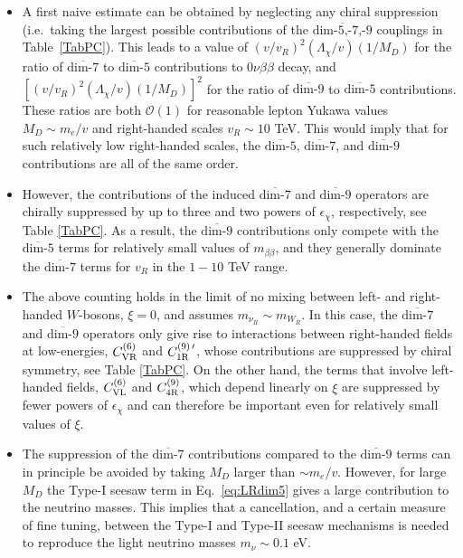 \documentclass[letterpaper,11pt]{article}
\newcommand{\bt}{\beta}
\newcommand{\textoverline}[1]{$\overline{\mbox{#1}}$}
\begin{document}
\begin{itemize}

\item  A first naive estimate can be obtained by neglecting any chiral suppression (i.e.\ taking the largest possible contributions of the \textoverline{dim-5,-7,-9} couplings in Table~\ref{TabPC}). This leads to a value of $(v/v_R)^2(\Lambda_\chi/v)(1/M_D)$ for the ratio of \textoverline{dim-7} to \textoverline{dim-5} contributions to $0\nu\beta\beta$ decay, and $[(v/v_R)^2(\Lambda_\chi/v)(1/M_D)]^2$ for the ratio of \textoverline{dim-9} to \textoverline{dim-5} contributions. These ratios are both $\mathcal O(1)$ for reasonable lepton Yukawa values $M_D \sim m_e/v$ and right-handed scales $v_R \sim 10$ TeV. This would imply that for such relatively low right-handed scales, the \textoverline{dim-5}, \textoverline{dim-7}, and \textoverline{dim-9} contributions are all of the same order.



\item  
However, the contributions of the induced \textoverline{dim-7} and \textoverline{dim-9} operators are chirally suppressed by 
up to  three and two powers of $\epsilon_\chi$, respectively, see Table \ref{TabPC}. 
As a result, the  \textoverline{dim-9} contributions  only compete with the \textoverline{dim-5} terms for relatively small values of $m_{\bt\bt}$, and they generally dominate the  \textoverline{dim-7} terms for $v_R$ in the $1-10$ TeV range. 

\item 
The above  counting holds in the limit of no mixing between left- and right-handed $W$-bosons, 
$\xi = 0$, and assumes $m_{\nu_R}\sim m_{W_R}$. In this case, the \textoverline{dim-7} and \textoverline{dim-9} operators only give rise to interactions between right-handed  fields at low-energies, $C_{\rm VR}^{(6)}$ and
$C_{\rm 1R}^{(9)\,\prime}$,
 whose contributions are suppressed by chiral symmetry,  see Table \ref{TabPC}.  On the other hand, the terms that involve left-handed fields, $C_{\rm VL}^{(6)}$ and  $C^{(9)}_{\rm 4R}$, which depend linearly on $\xi$ are suppressed by fewer powers of $\epsilon_\chi$ and  can  therefore be important even for relatively small values of $\xi$. 



\item 
The suppression of the  \textoverline{dim-7} contributions compared to the  \textoverline{dim-9} terms can in principle be avoided by taking $M_D$ larger than $\sim m_e/v$. However, for large $M_D$ the Type-I seesaw term in Eq.\ \eqref{eq:LRdim5} gives a large contribution to the neutrino masses. This implies that a cancellation, and a certain measure of fine tuning, between the Type-I and Type-II seesaw mechanisms is needed  to reproduce the light neutrino masses $m_\nu\sim 0.1$ eV. 


\end{itemize}
\end{document}
